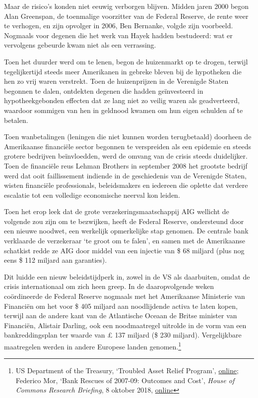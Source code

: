 \documentclass[
  a5paper,
  smalldemyvopaper,11pt,twoside,onecolumn,openright,extrafontsizes]{memoir}
\begin{document}
Maar de risico's konden niet eeuwig verborgen blijven. Midden jaren 2000
begon Alan Greenspan, de toenmalige voorzitter van de Federal Reserve,
de rente weer te verhogen, en zijn opvolger in 2006, Ben Bernanke,
volgde zijn voorbeeld. Nogmaals voor degenen die het werk van Hayek
hadden bestudeerd: wat er vervolgens gebeurde kwam niet als een
verrassing.

Toen het duurder werd om te lenen, begon de huizenmarkt op te drogen,
terwijl tegelijkertijd steeds meer Amerikanen in gebreke bleven bij de
hypotheken die hen zo vrij waren verstrekt. Toen de huizenprijzen in de
Verenigde Staten begonnen te dalen, ontdekten degenen die hadden
geïnvesteerd in hypotheekgebonden effecten dat ze lang niet zo veilig
waren als geadverteerd, waardoor sommigen van hen in geldnood kwamen om
hun eigen schulden af te betalen.

Toen wanbetalingen (leningen die niet kunnen worden terugbetaald)
doorheen de Amerikaanse financiële sector begonnen te verspreiden als
een epidemie en steeds grotere bedrijven beïnvloedden, werd de omvang
van de crisis steeds duidelijker. Toen de financiële reus Lehman
Brothers in september 2008 het grootste bedrijf werd dat ooit
faillissement indiende in de geschiedenis van de Verenigde Staten,
wisten financiële professionals, beleidsmakers en iedereen die oplette
dat verdere escalatie tot een volledige economische neerval kon leiden.

Toen het erop leek dat de grote verzekeringsmaatschappij AIG wellicht de
volgende zou zijn om te bezwijken, heeft de Federal Reserve, ondersteund
door een nieuwe noodwet, een werkelijk opmerkelijke stap genomen. De
centrale bank verklaarde de verzekeraar `te groot om te falen', en samen
met de Amerikaanse schatkist redde ze AIG door middel van een injectie
van \$ 68 miljard (plus nog eens \$ 112 miljard aan garanties).

Dit luidde een nieuw beleidstijdperk in, zowel in de VS als daarbuiten,
omdat de crisis internationaal om zich heen greep. In de daaropvolgende
weken coördineerde de Federal Reserve nogmaals met het Amerikaanse
Ministerie van Financiën om het voor \$ 405 miljard aan noodlijdende
activa te laten kopen, terwijl aan de andere kant van de Atlantische
Oceaan de Britse minister van Financiën, Alistair Darling, ook een
noodmaatregel uitrolde in de vorm van een bankreddingsplan ter waarde
van £ 137 miljard (\$ 230 miljard). Vergelijkbare maatregelen werden in
andere Europese landen genomen.\footnote{US Department of the Treasury,
  `Troubled Asset Relief Program',
  \href{https://home.treasury.gov/data/troubled-asset-relief-program}{online};
  Federico Mor, `Bank Rescues of 2007-09: Outcomes and Cost',
  \emph{House of Commons Research Briefing}, 8 oktober 2018,
  \href{https://commonslibrary.parliament.uk/research-briefings/sn05748/}{online}}
\end{document}
